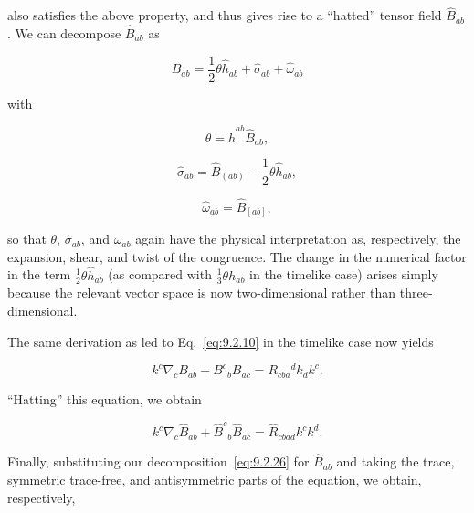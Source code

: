also satisfies the above property, and thus gives rise to a ``hatted'' tensor field
\(\widehat B_{ab}\). We can decompose \(\widehat B_{ab}\) as

\begin{equation}
  \widehat B_{ab}
  =\frac12\theta\widehat h_{ab}+\widehat\sigma_{ab}+\widehat\omega_{ab}
  \tag{9.2.26}\label{eq:9.2.26}
\end{equation}

with

\begin{equation}
  \theta=\widehat h^{ab}\widehat B_{ab} ,
  \tag{9.2.27}\label{eq:9.2.27}
\end{equation}

\begin{equation}
  \widehat\sigma_{ab}
  =\widehat B_{(ab)}-\frac12\theta\widehat h_{ab} ,
  \tag{9.2.28}\label{eq:9.2.28}
\end{equation}

\begin{equation}
  \widehat\omega_{ab}=\widehat B_{[ab]} ,
  \tag{9.2.29}\label{eq:9.2.29}
\end{equation}

so that \(\theta\), \(\widehat\sigma_{ab}\), and \(\widehat\omega_{ab}\) again have the
physical interpretation as, respectively, the expansion, shear, and twist of the
congruence. The change in the numerical factor in the term
\(\frac12\theta\widehat h_{ab}\) (as compared with \(\frac13\theta h_{ab}\) in the
timelike case) arises simply because the relevant vector space is now two-dimensional
rather than three-dimensional.

The same derivation as led to Eq.~\eqref{eq:9.2.10} in the timelike case now yields

\begin{equation}
  k^c\nabla_cB_{ab}+B^c{}_bB_{ac}=R_{cba}{}^dk_dk^c .
  \tag{9.2.30}\label{eq:9.2.30}
\end{equation}

``Hatting'' this equation, we obtain

\begin{equation}
  k^c\nabla_c\widehat B_{ab}
  +\widehat B^c{}_b\widehat B_{ac}
  =\widehat R_{cbad}k^ck^d .
  \tag{9.2.31}\label{eq:9.2.31}
\end{equation}

Finally, substituting our decomposition~\eqref{eq:9.2.26} for \(\widehat B_{ab}\) and
taking the trace, symmetric trace-free, and antisymmetric parts of the equation, we
obtain, respectively,

